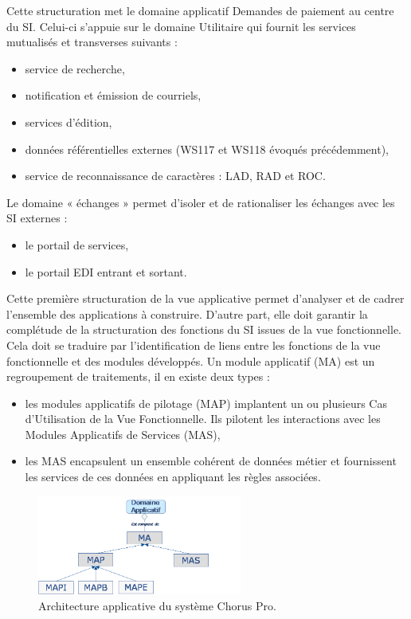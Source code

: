 \documentclass[12pt,a4paper]{article}
\begin{document}
\newpage
Cette structuration met le domaine applicatif Demandes de paiement au centre du \gls{SI}. Celui-ci s’appuie sur le domaine Utilitaire qui fournit les services mutualisés et transverses suivants :
\smallbreak
\begin{itemize}
\item	service de recherche,
\item	notification et émission de courriels,
\item	services d'édition,
\item	données référentielles externes (WS117 et WS118 évoqués précédemment),
\item	service de reconnaissance de caractères : \gls{LAD}, \gls{RAD} et \gls{ROC}.
\end{itemize}
\medbreak
Le domaine « échanges » permet d’isoler et de rationaliser les échanges avec les SI externes :
\smallbreak
\begin{itemize}
\item	le portail de services,
\item	le portail EDI entrant et sortant.
\end{itemize}
\medbreak
Cette première structuration de la vue applicative permet d’analyser et de cadrer l’ensemble des applications à construire. D’autre part, elle doit garantir la complétude de la structuration des fonctions du \gls{SI} issues de la vue fonctionnelle. Cela doit se traduire par l’identification de liens entre les fonctions de la vue fonctionnelle et des modules développés.
\smallbreak
Un module applicatif (MA) est un regroupement de traitements, il en existe deux types :
\begin{itemize}
\item les modules applicatifs de pilotage (MAP) implantent un ou plusieurs Cas d’Utilisation de la Vue Fonctionnelle. Ils pilotent les interactions avec les Modules Applicatifs de Services (MAS),
\item les MAS encapsulent un ensemble cohérent de données métier et fournissent les services de ces données en appliquant les règles associées.
\end{itemize}
\begin{figure}[H]
	\begin{center}
		\includegraphics[width=0.6\textwidth, keepaspectratio]{archiApplicative.png}
		\caption{Architecture applicative du système Chorus Pro.}
	\end{center}
\end{figure}
\clearpage
\newpage
\end{document}
